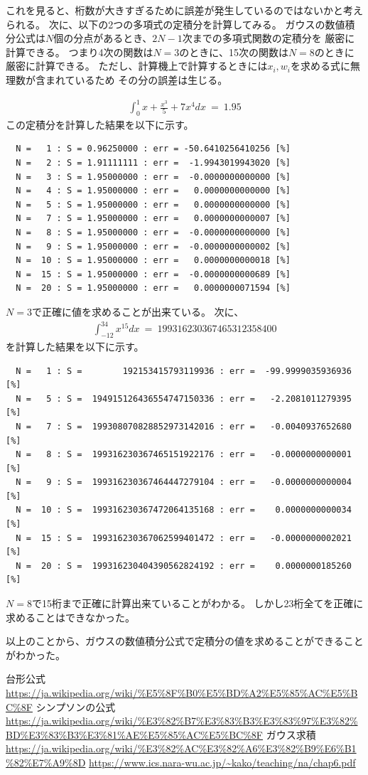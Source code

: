 \documentclass[dvipdfmx]{jsarticle}
\begin{document}
これを見ると、桁数が大きすぎるために誤差が発生しているのではないかと考えられる。
次に、以下の2つの多項式の定積分を計算してみる。
ガウスの数値積分公式は$N$個の分点があるとき、$2N-1$次までの多項式関数の定積分を
厳密に計算できる。
つまり4次の関数は$N=3$のときに、15次の関数は$N=8$のときに厳密に計算できる。
ただし、計算機上で計算するときには$x_i,w_i$を求める式に無理数が含まれているため
その分の誤差は生じる。

\begin{eqnarray}
  \int_{0}^{1} x+\frac{x^3}{5}+7x^4 dx ~=~ 1.95
\end{eqnarray}
この定積分を計算した結果を以下に示す。
\begin{verbatim}
  N =   1 : S = 0.96250000 : err = -50.6410256410256 [%]
  N =   2 : S = 1.91111111 : err =  -1.9943019943020 [%]
  N =   3 : S = 1.95000000 : err =  -0.0000000000000 [%]
  N =   4 : S = 1.95000000 : err =   0.0000000000000 [%]
  N =   5 : S = 1.95000000 : err =   0.0000000000000 [%]
  N =   7 : S = 1.95000000 : err =   0.0000000000007 [%]
  N =   8 : S = 1.95000000 : err =  -0.0000000000000 [%]
  N =   9 : S = 1.95000000 : err =  -0.0000000000002 [%]
  N =  10 : S = 1.95000000 : err =   0.0000000000018 [%]
  N =  15 : S = 1.95000000 : err =  -0.0000000000689 [%]
  N =  20 : S = 1.95000000 : err =   0.0000000071594 [%]
\end{verbatim}
$N=3$で正確に値を求めることが出来ている。
次に、
\begin{eqnarray}
  \int_{-12}^{34} x^{15} dx ~=~ 199316230367465312358400
\end{eqnarray}
を計算した結果を以下に示す。
\begin{verbatim}
  N =   1 : S =        192153415793119936 : err =  -99.9999035936936 [%]
  N =   5 : S =  194915126436554747150336 : err =   -2.2081011279395 [%]
  N =   7 : S =  199308070828852973142016 : err =   -0.0040937652680 [%]
  N =   8 : S =  199316230367465151922176 : err =   -0.0000000000001 [%]
  N =   9 : S =  199316230367464447279104 : err =   -0.0000000000004 [%]
  N =  10 : S =  199316230367472064135168 : err =    0.0000000000034 [%]
  N =  15 : S =  199316230367062599401472 : err =   -0.0000000002021 [%]
  N =  20 : S =  199316230404390562824192 : err =    0.0000000185260 [%]
\end{verbatim}

$N=8$で15桁まで正確に計算出来ていることがわかる。
しかし23桁全てを正確に求めることはできなかった。

以上のことから、ガウスの数値積分公式で定積分の値を求めることができることがわかった。

\begin{thebibliography}{10}
   台形公式
  \url{https://ja.wikipedia.org/wiki/%E5%8F%B0%E5%BD%A2%E5%85%AC%E5%BC%8F}
   シンプソンの公式
  \url{https://ja.wikipedia.org/wiki/%E3%82%B7%E3%83%B3%E3%83%97%E3%82%BD%E3%83%B3%E3%81%AE%E5%85%AC%E5%BC%8F}
   ガウス求積
  \url{https://ja.wikipedia.org/wiki/%E3%82%AC%E3%82%A6%E3%82%B9%E6%B1%82%E7%A9%8D}
  \url{https://www.ics.nara-wu.ac.jp/~kako/teaching/na/chap6.pdf}

\end{thebibliography}
\end{document}

